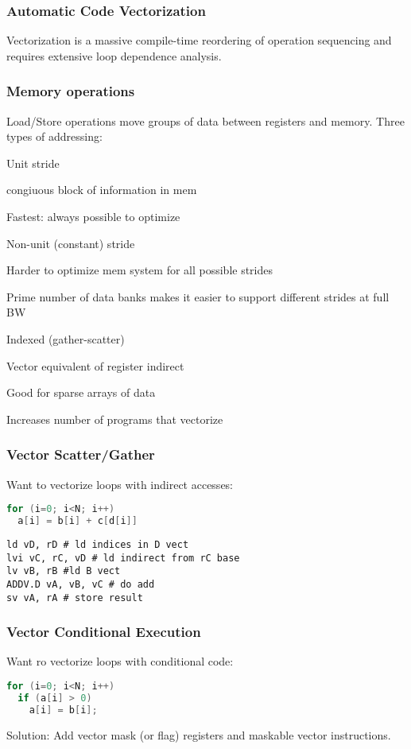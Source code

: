 \documentclass[a4paper, fontsize=8pt, landscape, DIV=1]{scrartcl}
\makeatletter
\renewenvironment{outline}[1][]{%
  \ifthenelse{\equal{#1}{}}{}{\renewcommand{\ol@type}{#1}}%
  \ol@z%
  \newcommand{\0}{\ol@toz\ol@z}%
  \newcommand{\1}{\vspace{\dimexpr\outlinespacingscalar\baselineskip-\baselineskip}\ol@toi\ol@i\item}%
  \newcommand{\2}{\vspace{\dimexpr\outlinespacingscalartwo\baselineskip-\baselineskip}\ol@toii\ol@ii\item}%
  \newcommand{\3}{\vspace{\dimexpr\outlinespacingscalar\baselineskip-\baselineskip}\ol@toiii\ol@iii\item}%
  \newcommand{\4}{\vspace{\dimexpr\outlinespacingscalar\baselineskip-\baselineskip}\ol@toiiii\ol@iiii\item}%
}{%
  \ol@toz\ol@exit%
}
\def\outlinespacingscalar{0.5}
\def\outlinespacingscalartwo{0.5}
\makeatother
\begin{document}
\begin{multicols*}{4}
  \subsubsection{Automatic Code Vectorization}
  Vectorization is a massive compile-time reordering of operation sequencing and
  requires extensive loop dependence analysis.

  \subsubsection{Memory operations}
  Load/Store operations move groups of data between registers and memory. Three types
  of addressing:
  \begin{outline}
    \1 Unit stride
      \2 congiuous block of information in mem
      \2 Fastest: always possible to optimize
    \1 Non-unit (constant) stride
      \2 Harder to optimize mem system for all possible strides
      \2 Prime number of data banks makes it easier to support different
          strides at full BW
    \1 Indexed (gather-scatter)
      \2 Vector equivalent of register indirect
      \2 Good for sparse arrays of data
      \2 Increases number of programs that vectorize
  \end{outline}

  \subsubsection{Vector Scatter/Gather}
  Want to vectorize loops with indirect accesses:
  \begin{lstlisting}[language=C]
for (i=0; i<N; i++)
  a[i] = b[i] + c[d[i]]\end{lstlisting}

  \begin{lstlisting}[language={[x86masm]Assembler}]
ld vD, rD # ld indices in D vect
lvi vC, rC, vD # ld indirect from rC base
lv vB, rB #ld B vect
ADDV.D vA, vB, vC # do add
sv vA, rA # store result\end{lstlisting}

  \subsubsection{Vector Conditional Execution}
  Want ro vectorize loops with conditional code:
  \begin{lstlisting}[language=C]
for (i=0; i<N; i++)
  if (a[i] > 0) 
    a[i] = b[i];\end{lstlisting}

  Solution: Add vector mask (or flag) registers and maskable vector instructions.


\end{multicols*}
\end{document}
